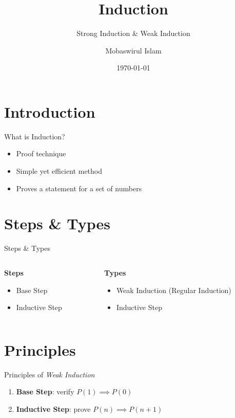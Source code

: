 \documentclass{beamer}
\title{Induction}
\subtitle{Strong Induction \& Weak Induction}
\author{Mobaswirul Islam}
\institute[CSE, BUET]{Computer Science \& Engineering, Bangladesh University of Engineering \& Technology}
\date{\today}
\begin{document}
\begin{frame}{}
    \titlepage
\end{frame}

\section{Introduction}
\begin{frame}{What is Induction?}
    \begin{itemize}
        \item Proof technique \pause
        \item Simple yet efficient method \pause
        \item Proves a statement for a set of numbers
    \end{itemize}
\end{frame}

\section{Steps \& Types}

\begin{frame}{Steps \& Types}
\begin{columns}
    \begin{column}{0.3\textwidth}
    \textbf{Steps}
    \begin{itemize}
        \item Base Step
        \item Inductive Step
    \end{itemize}
    \end{column}
    \begin{column}{0.4\textwidth}
    \pause
    \textbf{Types}
    \begin{itemize}
        \item Weak Induction (Regular Induction)
        \item Inductive Step
    \end{itemize}
    \end{column}
\end{columns}
\end{frame}

\section{Principles}
\begin{frame}{Principles of \textit{Weak Induction}}
    \begin{enumerate}
        \item \textbf{Base Step}: verify $P(1) \implies P(0)$ \pause
        \item \textbf{Inductive Step}: prove $P(n) \implies P(n+1)$
    \end{enumerate}
\end{frame}
\end{document}
